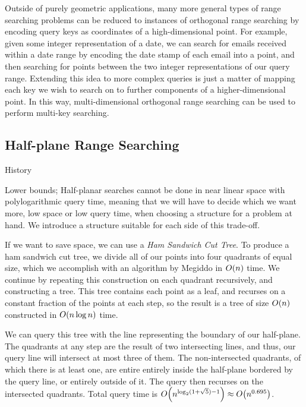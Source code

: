 Outside of purely geometric applications, many more general types of range searching problems can be reduced to instances of orthogonal range searching by encoding query keys as coordinates of a high-dimensional point.
For example, given some integer representation of a date, we can search for emails received within a date range by encoding the date stamp of each email into a point, and then searching for points between the two integer representations of our query range.
Extending this idea to more complex queries is just a matter of mapping each key we wish to search on to further components of a higher-dimensional point.  
In this way, multi-dimensional orthogonal range searching can be used to perform multi-key searching.\cite{Willard96} 


\subsection*{Half-plane Range Searching}

History

Lower bounds;  
Half-planar searches cannot be done in near linear space with polylogarithmic query time, meaning that we will have to decide which we want more, low space or low query time, when choosing a structure for a problem at hand.
We introduce a structure suitable for each side of this trade-off.

If we want to save space, we can use a \emph{Ham Sandwich Cut Tree}\cite{Edelsbrunner86, Edelsbrunner87}.
To produce a ham sandwich cut tree, we divide all of our points into four quadrants of equal size, which we accomplish with an algorithm by Megiddo\cite{Megiddo85} in $O\!\left(n\right)$ time.
We continue by repeating this construction on each quadrant recursively, and constructing a tree.
This tree contains each point as a leaf, and recurses on a constant fraction of the points at each step, so the result is a tree of size $O\!\left(n\right)$ constructed in $O\!\left(n\log{n}\right)$ time.

We can query this tree with the line representing the boundary of our half-plane.
The quadrants at any step are the result of two intersecting lines, and thus, our query line will intersect at most three of them.
The non-intersected quadrants, of which there is at least one, are entire entirely inside the half-plane bordered by the query line, or entirely outside of it.
The query then recurses on the intersected quadrants.
Total query time is $O\!\left(n^{\log_2(1 + \sqrt{5}) - 1}\right) \approx O\!\left(n^{0.695}\right)$.

